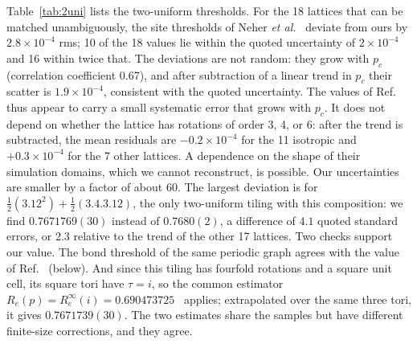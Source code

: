\documentclass[pre,twocolumn,superscriptaddress,longbibliography,floatfix]{revtex4-2}
\newcommand{\pc}{p_c}
\begin{document}
Table~\ref{tab:2uni} lists the two-uniform thresholds. For the 18 lattices that can be matched unambiguously, the site thresholds of Neher \textit{et al.}~\cite{Neher08supp} deviate from ours by $2.8\times10^{-4}$ rms; 10 of the 18 values lie within the quoted uncertainty of $2\times10^{-4}$ and 16 within twice that. The deviations are not random: they grow with $\pc$ (correlation coefficient 0.67), and after subtraction of a linear trend in $\pc$ their scatter is $1.9\times10^{-4}$, consistent with the quoted uncertainty. The values of Ref.~\cite{Neher08supp} thus appear to carry a small systematic error that grows with $\pc$. It does not depend on whether the lattice has rotations of order 3, 4, or 6: after the trend is subtracted, the mean residuals are $-0.2\times10^{-4}$ for the 11 isotropic and $+0.3\times10^{-4}$ for the 7 other lattices. A dependence on the shape of their simulation domains, which we cannot reconstruct, is possible. Our uncertainties are smaller by a factor of about 60. The largest deviation is for $\tfrac12(3.12^2)+\tfrac12(3.4.3.12)$, the only two-uniform tiling with this composition: we find $0.7671769(30)$ instead of $0.7680(2)$, a difference of $4.1$ quoted standard errors, or 2.3 relative to the trend of the other 17 lattices. Two checks support our value. The bond threshold of the same periodic graph agrees with the value of Ref.~\cite{Lebrecht21} (below). And since this tiling has fourfold rotations and a square unit cell, its square tori have $\tau=i$, so the common estimator $R_e(p)=R_e^\infty(i)=0.690473725$~\cite{Pinson94,NewmanZiff01} applies; extrapolated over the same three tori, it gives $0.7671739(30)$. The two estimates share the samples but have different finite-size corrections, and they agree.
\end{document}

